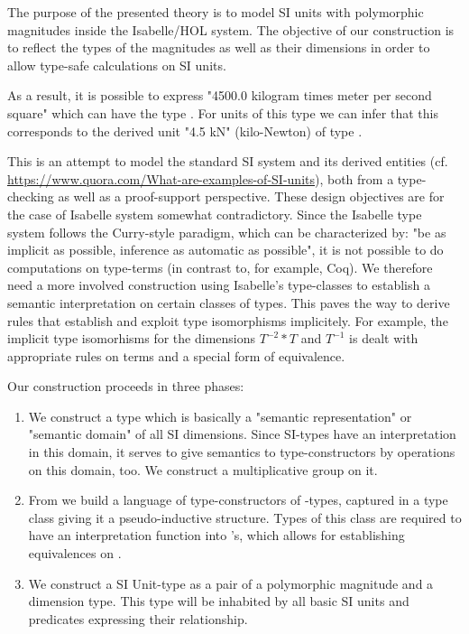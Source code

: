 \documentclass[11pt,a4paper]{book}
\begin{document}
The purpose of the presented theory is to model SI units with polymorphic magnitudes inside the
Isabelle/HOL\cite{nipkow.ea:isabelle:2002} system. The objective of our construction is to
reflect the types of the magnitudes as well as their dimensions in order to allow type-safe 
calculations on SI units.

As a result, it is possible to express "4500.0 kilogram times meter per second square" which can
have the type 
. 
For units of this type we can infer that this corresponds to the derived unit "4.5 kN" (kilo-Newton) 
 of type .  

This is an attempt to model the standard SI system and its derived entities (cf.
\url{https://www.quora.com/What-are-examples-of-SI-units}),
both from a type-checking as well as a proof-support perspective.
These design objectives are for the case of Isabelle system somewhat contradictory.
Since the Isabelle type system follows the Curry-style paradigm, which can be 
characterized by: "be as implicit as possible, inference as automatic as possible", it is not
possible to do computations on type-terms (in contrast to, for example, Coq). We therefore
need a more involved construction using Isabelle's type-classes to establish a semantic 
interpretation on certain classes of types. This paves the way to derive rules that
establish and exploit type isomorphisms implicitely. For example, the implicit
type isomorhisms for the dimensions $T^{-2} * T$ and $T^{-1}$ is dealt with appropriate
rules on terms and a special form of equivalence. 

Our construction proceeds in three phases:
\begin{enumerate}%
\item We construct a type  which is basically a "semantic representation" or
"semantic domain" of all SI dimensions. Since SI-types have an interpretation in this domain,
it serves to give semantics to type-constructors by operations on this domain, too.
We construct a multiplicative group on it.

\item From  we build a language of type-constructors of -types, 
 captured in a type class  giving it a pseudo-inductive structure. Types of
 this class are required to have  an interpretation function into 's, which
 allows for establishing equivalences on .
      
\item We construct a SI Unit-type as a pair of a polymorphic magnitude and a dimension type.
  This type will be inhabited by all basic SI units and predicates expressing their relationship.
\end{enumerate}%
\end{document}
